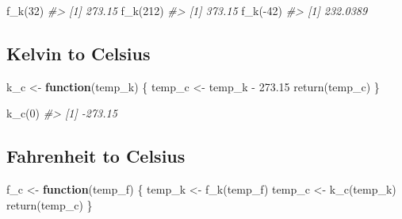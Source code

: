 \documentclass[
]{book}
\newenvironment{Shaded}{\begin{snugshade}}{\end{snugshade}}
\newcommand{\CommentTok}[1]{\textcolor[rgb]{0.56,0.35,0.01}{\textit{#1}}}
\newcommand{\ControlFlowTok}[1]{\textcolor[rgb]{0.13,0.29,0.53}{\textbf{#1}}}
\newcommand{\DecValTok}[1]{\textcolor[rgb]{0.00,0.00,0.81}{#1}}
\newcommand{\FloatTok}[1]{\textcolor[rgb]{0.00,0.00,0.81}{#1}}
\newcommand{\FunctionTok}[1]{\textcolor[rgb]{0.00,0.00,0.00}{#1}}
\newcommand{\NormalTok}[1]{#1}
\newcommand{\OtherTok}[1]{\textcolor[rgb]{0.56,0.35,0.01}{#1}}
\newcommand{\SpecialCharTok}[1]{\textcolor[rgb]{0.00,0.00,0.00}{#1}}
\begin{document}
\begin{Shaded}
\begin{Highlighting}[]
\FunctionTok{f\_k}\NormalTok{(}\DecValTok{32}\NormalTok{)}
\CommentTok{\#\textgreater{} [1] 273.15}
\FunctionTok{f\_k}\NormalTok{(}\DecValTok{212}\NormalTok{)}
\CommentTok{\#\textgreater{} [1] 373.15}
\FunctionTok{f\_k}\NormalTok{(}\SpecialCharTok{{-}}\DecValTok{42}\NormalTok{)}
\CommentTok{\#\textgreater{} [1] 232.0389}
\end{Highlighting}
\end{Shaded}

\hypertarget{kelvin-to-celsius}{%
\subsection{Kelvin to Celsius}\label{kelvin-to-celsius}}

\begin{Shaded}
\begin{Highlighting}[]
\NormalTok{k\_c }\OtherTok{\textless{}{-}} \ControlFlowTok{function}\NormalTok{(temp\_k) \{}
\NormalTok{    temp\_c }\OtherTok{\textless{}{-}}\NormalTok{ temp\_k }\SpecialCharTok{{-}} \FloatTok{273.15}
    \FunctionTok{return}\NormalTok{(temp\_c)}
\NormalTok{\}}
\end{Highlighting}
\end{Shaded}

\begin{Shaded}
\begin{Highlighting}[]
\FunctionTok{k\_c}\NormalTok{(}\DecValTok{0}\NormalTok{)}
\CommentTok{\#\textgreater{} [1] {-}273.15}
\end{Highlighting}
\end{Shaded}

\hypertarget{fahrenheit-to-celsius}{%
\subsection{Fahrenheit to Celsius}\label{fahrenheit-to-celsius}}

\begin{Shaded}
\begin{Highlighting}[]
\NormalTok{f\_c }\OtherTok{\textless{}{-}} \ControlFlowTok{function}\NormalTok{(temp\_f) \{}
\NormalTok{    temp\_k }\OtherTok{\textless{}{-}} \FunctionTok{f\_k}\NormalTok{(temp\_f)}
\NormalTok{    temp\_c }\OtherTok{\textless{}{-}} \FunctionTok{k\_c}\NormalTok{(temp\_k)}
    \FunctionTok{return}\NormalTok{(temp\_c)}
\NormalTok{\}}
\end{Highlighting}
\end{Shaded}
\end{document}
